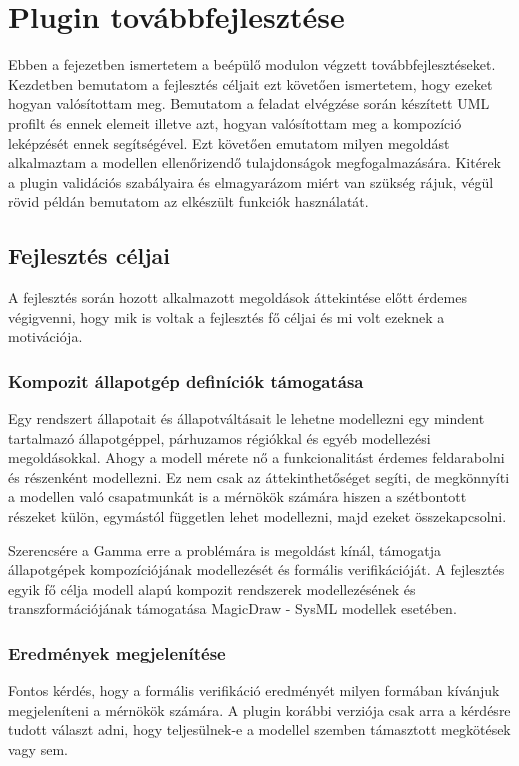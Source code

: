 \chapter{Plugin továbbfejlesztése}

Ebben a fejezetben ismertetem a beépülő modulon végzett továbbfejlesztéseket. Kezdetben bemutatom a fejlesztés céljait ezt követően ismertetem, hogy ezeket hogyan valósítottam meg. Bemutatom a feladat elvégzése során készített UML profilt és ennek elemeit illetve azt, hogyan valósítottam meg a kompozíció leképzését ennek segítségével. Ezt követően emutatom milyen megoldást alkalmaztam a modellen ellenőrizendő tulajdonságok megfogalmazására. Kitérek a plugin validációs szabályaira és elmagyarázom miért van szükség rájuk, végül rövid példán bemutatom az elkészült funkciók használatát.

\section{Fejlesztés céljai}

A fejlesztés során hozott alkalmazott megoldások áttekintése előtt érdemes végigvenni, hogy mik is voltak a fejlesztés fő céljai és mi volt ezeknek a motivációja.

\subsection{Kompozit állapotgép definíciók támogatása}
Egy rendszert állapotait és állapotváltásait le lehetne modellezni egy mindent tartalmazó állapotgéppel, párhuzamos régiókkal és egyéb modellezési megoldásokkal. Ahogy a modell mérete nő a funkcionalitást érdemes feldarabolni és részenként modellezni. Ez nem csak az áttekinthetőséget segíti, de megkönnyíti a modellen való csapatmunkát is a mérnökök számára hiszen a szétbontott részeket külön, egymástól független lehet modellezni, majd ezeket összekapcsolni.

Szerencsére a Gamma erre a problémára is megoldást kínál, támogatja állapotgépek kompozíciójának modellezését és formális verifikációját. A fejlesztés egyik fő célja modell alapú kompozit rendszerek modellezésének és transzformációjának támogatása MagicDraw - SysML modellek esetében.

\subsection{Eredmények megjelenítése}
Fontos kérdés, hogy a formális verifikáció eredményét milyen formában kívánjuk megjeleníteni a mérnökök számára. A plugin korábbi verziója csak arra a kérdésre tudott választ adni, hogy teljesülnek-e a modellel szemben támasztott megkötések vagy sem.

